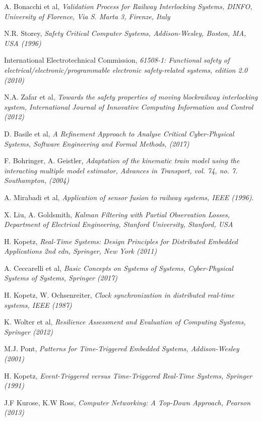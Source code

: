 \begin{thebibliography}{9}
A. Bonacchi et al, \textit{Validation Process for Railway Interlocking Systems, DINFO, University of Florence, Via S. Marta 3, Firenze, Italy}

N.R. Storey, \textit{Safety Critical Computer Systems,
Addison-Wesley, Boston, MA, USA (1996)}
	
International Electrotechnical Commission, \textit{61508-1: Functional safety of electrical/electronic/programmable electronic safety-related systems, edition 2.0 (2010)}

N.A. Zafar et al, \textit{Towards the safety properties of moving blockrailway interlocking system, International Journal of Innovative Computing Information and Control (2012)}

D. Basile et al, \textit{A Refinement Approach to Analyse Critical Cyber-Physical Systems,
Software Engineering and Formal Methods, (2017)}

F. Bohringer, A. Geistler, \textit{Adaptation of the kinematic train
model using the interacting multiple model estimator, Advances in
Transport, vol. 74, no. 7. Southampton, (2004)}

A. Mirabadi et al, \textit{Application of sensor fusion to railway systems, IEEE (1996)}.

X. Liu, A. Goldsmith, \textit{
Kalman  Filtering with Partial Observation Losses, Department of Electrical Engineering, Stanford University, Stanford, USA}

H. Kopetz, \textit{Real-Time Systems: Design Principles for Distributed Embedded Applications 2nd edn, Springer, New York (2011)}

A. Ceccarelli et al, \emph{Basic Concepts on Systems of Systems, Cyber-Physical Systems of Systems, Springer (2017)}

H. Kopetz, W. Ochsenreiter, \textit{Clock synchronization in distributed real-time systems, IEEE (1987)}

K. Wolter et al,
\textit{Resilience Assessment and Evaluation of Computing Systems, Springer (2012)}

M.J. Pont, \emph{Patterns for Time-Triggered Embedded Systems, Addison-Wesley (2001)}

H. Kopetz, \emph{Event-Triggered versus Time-Triggered Real-Time Systems, Springer (1991)}

J.F Kurose, K.W Ross, \emph{Computer Networking: A Top-Down Approach, Pearson (2013)}

\end{thebibliography}
